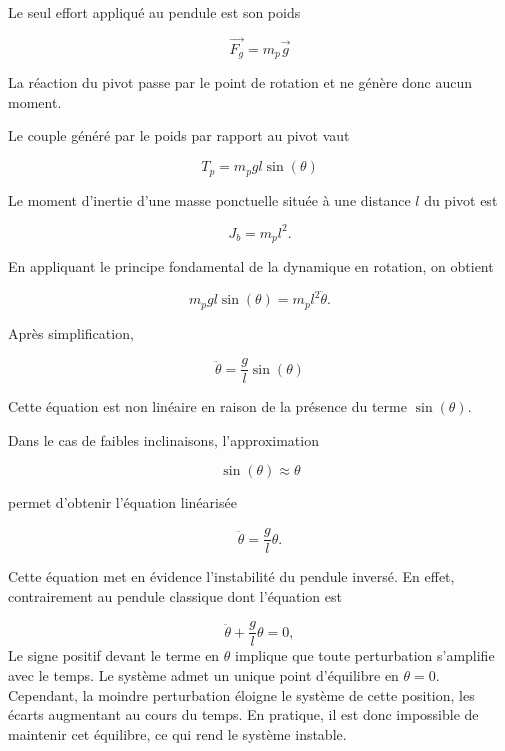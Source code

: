 Le seul effort appliqué au pendule est son poids

\begin{equation}
\vec{F_g}=m_p\vec{g}
\end{equation}

La réaction du pivot passe par le point de rotation et ne génère donc aucun moment.

Le couple généré par le poids par rapport au pivot vaut

\begin{equation}
T_p = m_pgl\sin(\theta)
\end{equation}

Le moment d'inertie d'une masse ponctuelle située à une distance $l$ du pivot est

\begin{equation}
J_b = m_pl^2.
\end{equation}

En appliquant le principe fondamental de la dynamique en rotation, on obtient

\begin{equation}
m_pgl\sin(\theta)=m_pl^2\ddot{\theta}.
\end{equation}

Après simplification,

\begin{equation}
\boxed{\ddot{\theta}=\frac{g}{l}\sin(\theta)}
\end{equation}

Cette équation est non linéaire en raison de la présence du terme $\sin(\theta)$.

Dans le cas de faibles inclinaisons, l'approximation

\begin{equation}
\sin(\theta)\approx\theta
\end{equation}

permet d'obtenir l'équation linéarisée

\begin{equation}
\boxed{\ddot{\theta}=\frac{g}{l}\theta.}
\end{equation}

Cette équation met en évidence l'instabilité du pendule inversé. En effet, contrairement au pendule classique dont l'équation est

\begin{equation}
\ddot{\theta}+\frac{g}{l}\theta=0,
\end{equation}
Le signe positif devant le terme en $\theta$ implique que toute perturbation s'amplifie avec le temps. Le système admet un unique point d'équilibre en $\theta = 0$. Cependant, la moindre perturbation éloigne le système de cette position, les écarts augmentant au cours du temps. En pratique, il est donc impossible de maintenir cet équilibre, ce qui rend le système instable.
